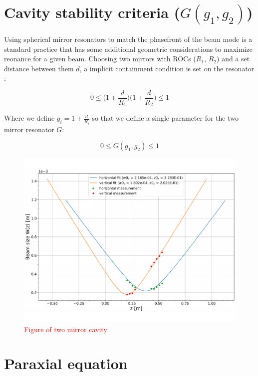 \section{Cavity stability criteria ($G(g_1,g_2)$)} \label{sec:cavstab}
Using spherical mirror resonators to match the phasefront of the beam mode is a standard practice that has some additional geometric considerations to maximize reonance for a given beam. Choosing two mirrors with ROCs ($R_1$, $R_2$) and a set distance between them $d$, a implicit containment condition is set on the resonator \cite{salehteich:2007}:

$$
	0 \leq \bigg(1 + \frac{d}{R_1} \bigg) \bigg(1 + \frac{d}{R_2} \bigg) \leq 1
$$

Where we define $g_i = 1 + \frac{d}{R_i}$ so that we define a single parameter for the two mirror resonator $G$:

\begin{equation}\label{eq:cavstab}
	0 \leq G(g_1,g_2) \leq 1
\end{equation}

\begin{figure}[H]
\includegraphics[width=\textwidth]{figs/ALGAAS/beam_scans/12_18_2020_preMMT.pdf}
\caption{\textcolor{red}{Figure of two mirror cavity}}
\label{fig:cav_stab}
\end{figure}

\section{Paraxial equation} \label{sec:paraxial}

